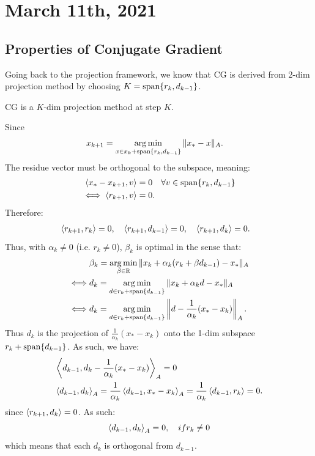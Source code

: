 \documentclass[../main/main.tex]{subfiles}
\begin{document}
\section{March 11th, 2021}
\subsection{Properties of Conjugate Gradient}
Going back to the projection framework, we know that CG is derived from 2-dim projection method by choosing $K = \operatorname{span} \{r_{k}, d_{k-1}\}$.
\begin{theorem}
CG is a $K$-dim projection method at step $K$.
\end{theorem}
  Since
  \begin{align*}
x_{k+1} &= \operatorname*{arg\,min} _{x\in x_{k}+\operatorname{span} \{r_{k},d_{k-1}\}} \|x_{*}-x\|_{A}
    .\end{align*}
  The residue vector must be orthogonal to the subspace, meaning:
  \begin{align*}
    \left\langle{x_{*}-x_{k+1}},{v}\right\rangle &= 0 \quad  \forall  v \in \operatorname{span} \{r_{k},d_{k-1}\}\\
   \iff   \left\langle{r_{k+1}},{v}\right\rangle &= 0
    .\end{align*}
  Therefore:
  \begin{align*}
& \left\langle{r_{k+1}},{r_{k}}\right\rangle= 0, \quad \left\langle{r_{k+1}},{d_{k-1}}\right\rangle=0, \quad \left\langle{r_{k+1}},{d_{k}}\right\rangle = 0
    .\end{align*}
  Thus, with $\alpha _{k}\neq 0$ (i.e. $r_{k}\neq 0$), $\beta _{k}$ is optimal in the sense that:
  \begin{align*}
    &\beta _{k} = \operatorname*{arg\,min}_{\beta \in \mathbb{R} }  \|x_{k}+\alpha _{k}(r_{k}+\beta d_{k-1})-x_{*}\|_{A}\\
    \iff & d_{k} = \operatorname*{arg\,min}_{d\in r_{k}+\operatorname{span} \{d_{k-1}\}} \|x_{k}+\alpha _{k}d - x_{*}\|_{A}\\
    \iff & d_{k} = \operatorname*{arg\,min}_{d\in r_{k}+\operatorname{span} \{d_{k-1}\}} \left\|d - \frac{1}{\alpha _{k}}(x_{*}-x_{k})\right\|_{A}
    .\end{align*}
  Thus $d_{k}$ is the projection of $\frac{1}{\alpha _{k}}(x_{*}-x_{k})$ onto the 1-dim subspace $r_{k}+\operatorname{span} \{d_{k-1}\}$. As such, we have:
  \begin{align*}
    &\left\langle{d_{k-1}},{d_{k}-\frac{1}{\alpha _{k}}(x_{*}-x_{k})}\right\rangle_{A}=0\\
    & \left\langle{d_{k-1}},{d_{k}}\right\rangle_{A} = \frac{1}{\alpha _{k}}\left\langle{d_{k-1}},{x_{*}-x_{k}}\right\rangle_{A} = \frac{1}{\alpha _{k}}\left\langle{d_{k-1}},{r_{k}}\right\rangle = 0
      .\end{align*} since $\left\langle{r_{k+1}},{d_{k}}\right\rangle=0$. As such: \[
      \left\langle{d_{k-1}},{d_{k}}\right\rangle_{A}=0, \quad  if r_{k}\neq 0
    \] which means that each $d_{k}$ is orthogonal from $d_{k-1}$.
\end{document}
